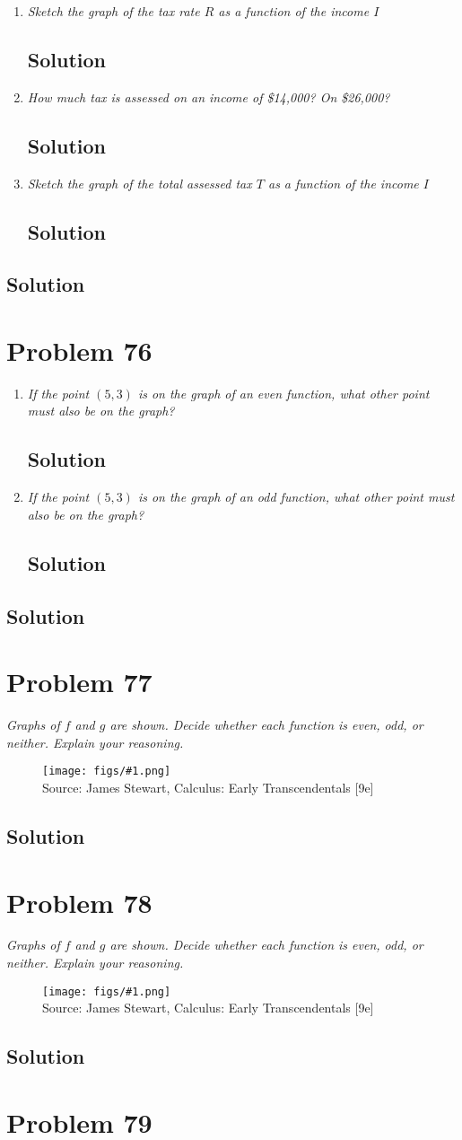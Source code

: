 \documentclass[11pt]{article}
\newcommand{\soln}{\subsection*}
\newcommand{\qn}{\textit}
\newcommand{\imagesource}[1]{{\footnotesize Source: #1}}
\newcommand{\imgqn}[1]{
	\begin{figure}[H]
		\centering
		\texttt{[image: figs/\#1.png]}\\
		\imagesource{James Stewart, Calculus: Early Transcendentals [9e]}
	\end{figure}
}
\begin{document}
\begin{enumerate}
	\item \qn{Sketch the graph of the tax rate $R$ as a function of the income $I$}
	\soln{Solution}
	
	\item \qn{How much tax is assessed on an income of \$14,000? On \$26,000?}
	\soln{Solution}
	
	\item \qn{Sketch the graph of the total assessed tax $T$ as a function of the income $I$}
	\soln{Solution}
\end{enumerate}

\soln{Solution}

\section*{Problem 76}

\begin{enumerate}
	\item \qn{If the point $(5,3)$ is on the graph of an even function, what other point must also be on the graph?}
	\soln{Solution}
	
	\item \qn{If the point $(5,3)$ is on the graph of an odd function, what other point must also be on the graph?}
	\soln{Solution}
\end{enumerate}

\soln{Solution}

\section*{Problem 77}

\qn{Graphs of $f$ and $g$ are shown. Decide whether each function is even, odd, or neither. Explain your reasoning.}

\imgqn{1.1.77}

\soln{Solution}

\section*{Problem 78}

\qn{Graphs of $f$ and $g$ are shown. Decide whether each function is even, odd, or neither. Explain your reasoning.}

\imgqn{1.1.78}

\soln{Solution}

\section*{Problem 79}
\end{document}
